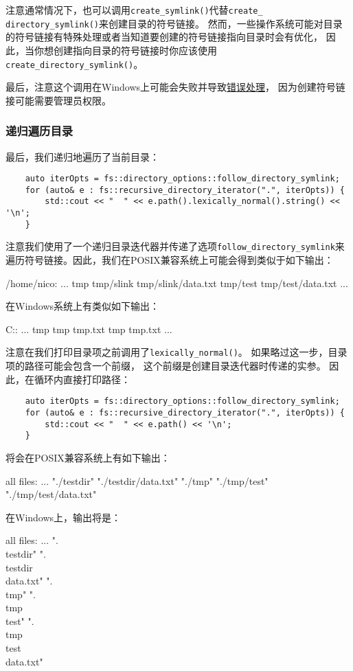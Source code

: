注意通常情况下，也可以调用\texttt{create\_symlink()}代替\texttt{create\_
directory\_symlink()}来创建目录的符号链接。
然而，一些操作系统可能对目录的符号链接有特殊处理或者当知道要创建的符号链接指向目录时会有优化，
因此，当你想创建指向目录的符号链接时你应该使用\texttt{create\_directory\_symlink()}。

最后，注意这个调用在Windows上可能会失败并导致\hyperref[创建链接失败]{错误处理}，
因为创建符号链接可能需要管理员权限。

\subsubsection{递归遍历目录}\label{ch20.1.3.5}
最后，我们递归地遍历了当前目录：
\begin{lstlisting}
    auto iterOpts = fs::directory_options::follow_directory_symlink;
    for (auto& e : fs::recursive_directory_iterator(".", iterOpts)) {
        std::cout << "  " << e.path().lexically_normal().string() << '\n';
    }
\end{lstlisting}
注意我们使用了一个递归目录迭代器并传递了选项\texttt{follow\_directory\_symlink}来
遍历符号链接。因此，我们在POSIX兼容系统上可能会得到类似于如下输出：
\begin{blacklisting}
    /home/nico:
    ...
    tmp
    tmp/slink
    tmp/slink/data.txt
    tmp/test
    tmp/test/data.txt
    ...
\end{blacklisting}
在Windows系统上有类似如下输出：
\begin{blacklisting}
    C:\Users\nico:
    ...
    tmp
    tmp\slink
    tmp\slink\data.txt
    tmp\test
    tmp\test\data.txt
    ...
\end{blacklisting}
注意在我们打印目录项之前调用了\texttt{lexically\_normal()}。
如果略过这一步，目录项的路径可能会包含一个前缀，
这个前缀是创建目录迭代器时传递的实参。
因此，在循环内直接打印路径：
\begin{lstlisting}
    auto iterOpts = fs::directory_options::follow_directory_symlink;
    for (auto& e : fs::recursive_directory_iterator(".", iterOpts)) {
        std::cout << "  " << e.path() << '\n';
    }
\end{lstlisting}
将会在POSIX兼容系统上有如下输出：
\begin{blacklisting}
    all files:
    ...
    "./testdir"
    "./testdir/data.txt"
    "./tmp"
    "./tmp/test"
    "./tmp/test/data.txt"
\end{blacklisting}
在Windows上，输出将是：
\begin{blacklisting}
    all files:
    ...
    ".\\testdir"
    ".\\testdir\\data.txt"
    ".\\tmp"
    ".\\tmp\\test"
    ".\\tmp\\test\\data.txt"
\end{blacklisting}
